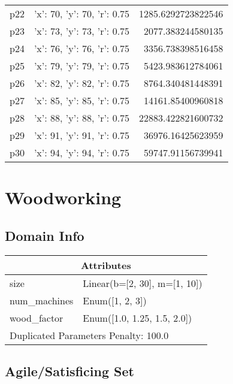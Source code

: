 \documentclass{article}
\begin{document}
\begin{center}
\begin{tabular}{r|r|r}
  p22&{'x': 70, 'y': 70, 'r': 0.75}&1285.6292723822546\\
  p23&{'x': 73, 'y': 73, 'r': 0.75}&2077.383244580135\\
  p24&{'x': 76, 'y': 76, 'r': 0.75}&3356.738398516458\\
  p25&{'x': 79, 'y': 79, 'r': 0.75}&5423.983612784061\\
  p26&{'x': 82, 'y': 82, 'r': 0.75}&8764.340481448391\\
  p27&{'x': 85, 'y': 85, 'r': 0.75}&14161.85400960818\\
  p28&{'x': 88, 'y': 88, 'r': 0.75}&22883.422821600732\\
  p29&{'x': 91, 'y': 91, 'r': 0.75}&36976.16425623959\\
  p30&{'x': 94, 'y': 94, 'r': 0.75}&59747.91156739941
                            \end{tabular}
                            \end{center}
                    
                            \newpage \section{Woodworking}
                    \subsection*{Domain Info}

                    \begin{center}
                    \begin{tabular}{p{}p{}}
                    \multicolumn{2}{c}{\bf \large Attributes}\\\midrule
                    size & Linear(b=[2, 30], m=[1, 10])\\
num\_machines & Enum([1, 2, 3])\\
wood\_factor & Enum([1.0, 1.25, 1.5, 2.0])
                    
                     \\\midrule
                    \multicolumn{2}{l}{Duplicated Parameters Penalty: 100.0}
                    \end{tabular}
                    \end{center}
                
                         \subsection*{Agile/Satisficing Set}
\end{document}
